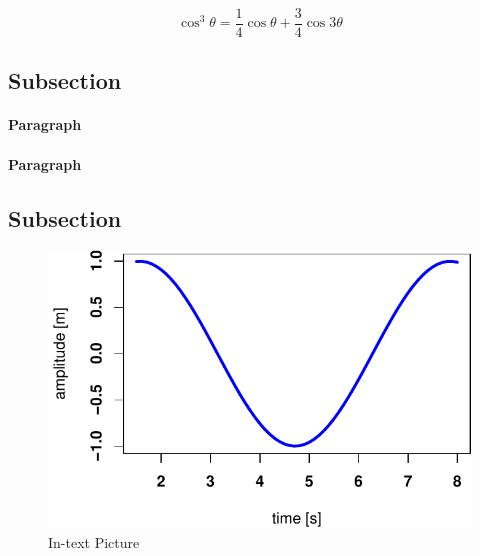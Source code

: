 \documentclass[fleqn,10pt,lineno]{wlpeerj} %
\begin{document}
\lipsum[4]

\begin{equation}
\cos^3 \theta =\frac{1}{4}\cos\theta+\frac{3}{4}\cos 3\theta
\label{eq:refname2}
\end{equation}

\lipsum[5]

\hypertarget{subsection}{%
\subsection*{Subsection}\label{subsection}}

\lipsum[6]

\paragraph{Paragraph} \lipsum[7] 
\paragraph{Paragraph} \lipsum[8]

\hypertarget{subsection-1}{%
\subsection*{Subsection}\label{subsection-1}}

\lipsum[9]

\begin{figure}
\includegraphics[width=1\linewidth]{paper_files/figure-latex/results-1} \caption{In-text Picture}\label{fig:results}
\end{figure}
\end{document}
